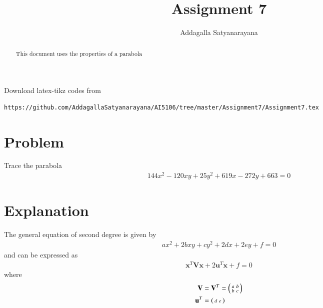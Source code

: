 \documentclass[journal,12pt,twocolumn]{IEEEtran}
\begin{document}
	\makeatother
	\let\StandardTheFigure\thefigure
	\let\vec\mathbf
	\renewcommand{\thefigure}{\theproblem}
	\def\putbox#1#2#3{\makebox[0in][l]{\makebox[#1][l]{}\raisebox{\baselineskip}[0in][0in]{\raisebox{#2}[0in][0in]{#3}}}}
	\def\rightbox#1{\makebox[0in][r]{#1}}
	\def\centbox#1{\makebox[0in]{#1}}
	\def\topbox#1{\raisebox{-\baselineskip}[0in][0in]{#1}}
	\def\midbox#1{\raisebox{-0.5\baselineskip}[0in][0in]{#1}}
	\vspace{3cm}
	\title{Assignment 7}
	\author{Addagalla Satyanarayana}
	\maketitle
	\newpage
	\bigskip
	\renewcommand{\thefigure}{\theenumi}
	\renewcommand{\thetable}{\theenumi}
\begin{abstract}
This document uses the properties of a parabola
\end{abstract}
Download latex-tikz codes from 
%
\begin{lstlisting}
https://github.com/AddagallaSatyanarayana/AI5106/tree/master/Assignment7/Assignment7.tex
\end{lstlisting}
%
\section{Problem}
	Trace the parabola
\begin{align}
	144x^2-120xy+25y^2+619x-272y+663=0\label{eq:1}
\end{align}

\section{Explanation}
The general equation of second degree is given by
\begin{align}
	ax^2+2bxy+cy^2+2dx+2ey+f=0 \label{gen_quad_eqn}
\end{align}
and can be expressed as
\begin{align}
	\vec{x}^T\vec{V}\vec{x}+2\vec{u}^T\vec{x}+f=0 \label{conic_quad_eqn}
\end{align}
where
\begin{align}
	\vec{V} &= \vec{V}^T = \myvec{a & b \\ b & c}
	\\
	\vec{u}^T &= \myvec{d & e}
\end{align}
\end{document}

